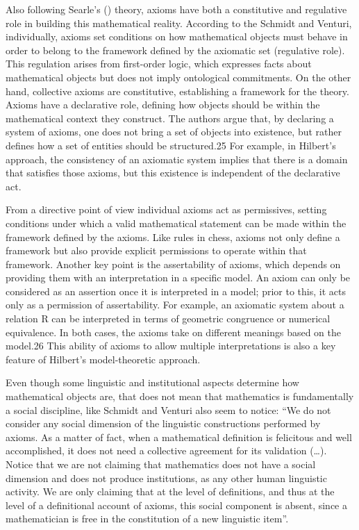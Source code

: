 \documentclass[11pt,a4paper]{article}
\begin{document}
Also following Searle's (\citeyear{searle1969}) theory, axioms have both a constitutive and regulative role in building this mathematical reality. According to the Schmidt and Venturi, individually, axioms set conditions on how mathematical objects must behave in order to belong to the framework defined by the axiomatic set (regulative role). This regulation arises from first-order logic, which expresses facts about mathematical objects but does not imply ontological commitments. On the other hand, collective axioms are constitutive, establishing a framework for the theory. Axioms have a declarative role, defining how objects should be within the mathematical context they construct. The authors argue that, by declaring a system of axioms, one does not bring a set of objects into existence, but rather defines how a set of entities should be structured.25 For example, in Hilbert's approach, the consistency of an axiomatic system implies that there is a domain that satisfies those axioms, but this existence is independent of the declarative act.  

From a directive point of view individual axioms act as permissives, setting conditions under which a valid mathematical statement can be made within the framework defined by the axioms. Like rules in chess, axioms not only define a framework but also provide explicit permissions to operate within that framework. Another key point is the assertability of axioms, which depends on providing them with an interpretation in a specific model. An axiom can only be considered as an assertion once it is interpreted in a model; prior to this, it acts only as a permission of assertability. For example, an axiomatic system about a relation R can be interpreted in terms of geometric congruence or numerical equivalence. In both cases, the axioms take on different meanings based on the model.26 This ability of axioms to allow multiple interpretations is also a key feature of Hilbert's model-theoretic approach. 

Even though some linguistic and institutional aspects determine how mathematical objects are, that does not mean that mathematics is fundamentally a social discipline, like Schmidt and Venturi also seem to notice: “We do not consider any social dimension of the linguistic constructions performed by axioms. As a matter of fact, when a mathematical definition is felicitous and well accomplished, it does not need a collective agreement for its validation (…). Notice that we are not claiming that mathematics does not have a social dimension and does not produce institutions, as any other human linguistic activity. We are only claiming that at the level of definitions, and thus at the level of a definitional account of axioms, this social component is absent, since a mathematician is free in the constitution of a new linguistic item”. 
\end{document}
